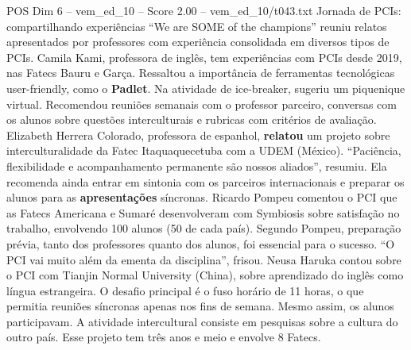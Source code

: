 \begin{textsample}{POS Dim 6 – vem\_ed\_10 – Score 2.00 – vem\_ed\_10/t043.txt}  \label{ex:f6_pos_035}
Jornada de PCIs: compartilhando experiências “We are SOME of the champions” reuniu relatos apresentados por professores com experiência consolidada em diversos tipos de PCIs.
Camila Kami, professora de inglês, tem experiências com PCIs desde 2019, nas Fatecs Bauru e Garça.
Ressaltou a importância de ferramentas tecnológicas user-friendly, como o \textbf{Padlet}.
Na atividade de ice-breaker, sugeriu um piquenique virtual.
Recomendou reuniões semanais com o professor parceiro, conversas com os alunos sobre questões interculturais e rubricas com critérios de avaliação.
Elizabeth Herrera Colorado, professora de espanhol, \textbf{relatou} um projeto sobre interculturalidade da Fatec Itaquaquecetuba com a UDEM (México). “Paciência, flexibilidade e acompanhamento permanente são nossos aliados”, resumiu.
Ela recomenda ainda entrar em sintonia com os parceiros internacionais e preparar os alunos para as \textbf{apresentações} síncronas.
Ricardo Pompeu comentou o PCI que as Fatecs Americana e Sumaré desenvolveram com Symbiosis sobre satisfação no trabalho, envolvendo 100 alunos (50 de cada país).
Segundo Pompeu, preparação prévia, tanto dos professores quanto dos alunos, foi essencial para o sucesso. “O PCI vai muito além da ementa da disciplina”, frisou.
Neusa Haruka contou sobre o PCI com Tianjin Normal University (China), sobre aprendizado do inglês como língua estrangeira.
O desafio principal é o fuso horário de 11 horas, o que permitia reuniões síncronas apenas nos fins de semana.
Mesmo assim, os alunos participavam.
A atividade intercultural consiste em pesquisas sobre a cultura do outro país.
Esse projeto tem três anos e meio e envolve 8 Fatecs.

\end{textsample}
